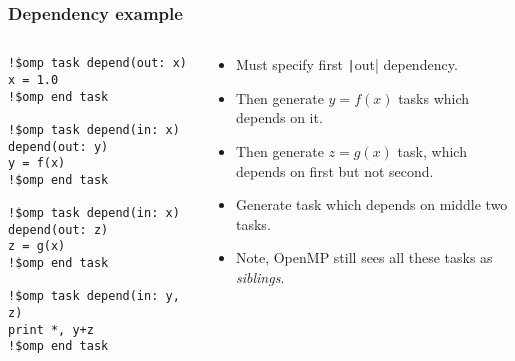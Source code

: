 \documentclass{beamer}
\begin{document}
\begin{frame}[fragile]
\frametitle{Dependency example}
\begin{columns}
\begin{column}{0.5\textwidth}
\begin{verbatim}
!$omp task depend(out: x)
x = 1.0
!$omp end task

!$omp task depend(in: x) depend(out: y)
y = f(x)
!$omp end task

!$omp task depend(in: x) depend(out: z)
z = g(x)
!$omp end task

!$omp task depend(in: y, z)
print *, y+z
!$omp end task
\end{verbatim}
\end{column}

\begin{column}{0.5\textwidth}
\begin{itemize}
  \item Must specify first \texttt|out| dependency.
  \item Then generate $y=f(x)$ tasks which depends on it.
  \item Then generate $z=g(x)$ task, which depends on first but not second.
  \item Generate task which depends on middle two tasks.
  \item Note, OpenMP still sees all these tasks as \emph{siblings}.
\end{itemize}
\end{column}
\end{columns}

\end{frame}

\end{document}
